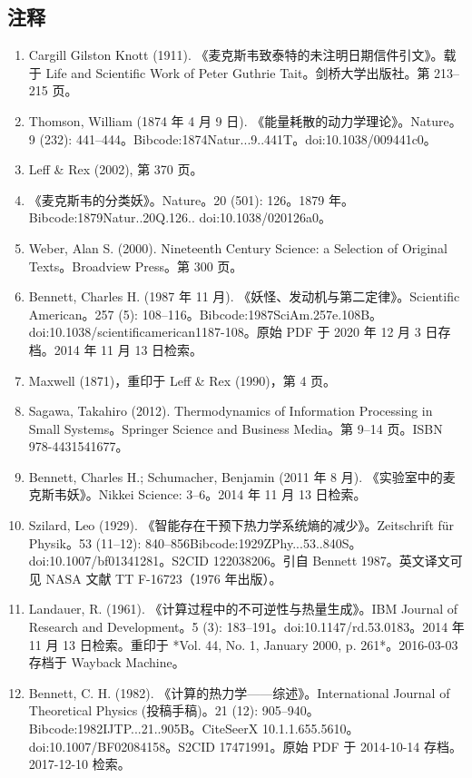 \subsection{注释}
\begin{enumerate}
\item Cargill Gilston Knott (1911). 《麦克斯韦致泰特的未注明日期信件引文》。载于 Life and Scientific Work of Peter Guthrie Tait。剑桥大学出版社。第 213–215 页。
\item Thomson, William (1874 年 4 月 9 日). 《能量耗散的动力学理论》。Nature。9 (232): 441–444。Bibcode:1874Natur...9..441T。doi:10.1038/009441c0。
\item Leff & Rex (2002), 第 370 页。
\item 《麦克斯韦的分类妖》。Nature。20 (501): 126。1879 年。Bibcode:1879Natur..20Q.126.. doi:10.1038/020126a0。
\item Weber, Alan S. (2000). Nineteenth Century Science: a Selection of Original Texts。Broadview Press。第 300 页。
\item Bennett, Charles H. (1987 年 11 月). 《妖怪、发动机与第二定律》。Scientific American。257 (5): 108–116。Bibcode:1987SciAm.257e.108B。doi:10.1038/scientificamerican1187-108。原始 PDF 于 2020 年 12 月 3 日存档。2014 年 11 月 13 日检索。
\item Maxwell (1871)，重印于 Leff & Rex (1990)，第 4 页。
\item Sagawa, Takahiro (2012). Thermodynamics of Information Processing in Small Systems。Springer Science and Business Media。第 9–14 页。ISBN 978-4431541677。
\item Bennett, Charles H.; Schumacher, Benjamin (2011 年 8 月). 《实验室中的麦克斯韦妖》。Nikkei Science: 3–6。2014 年 11 月 13 日检索。
\item Szilard, Leo (1929). 《智能存在干预下热力学系统熵的减少》。Zeitschrift für Physik。53 (11–12): 840–856Bibcode:1929ZPhy...53..840S。doi:10.1007/bf01341281。S2CID 122038206。引自 Bennett 1987。英文译文可见 NASA 文献 TT F-16723（1976 年出版）。
\item Landauer, R. (1961). 《计算过程中的不可逆性与热量生成》。IBM Journal of Research and Development。5 (3): 183–191。doi:10.1147/rd.53.0183。2014 年 11 月 13 日检索。重印于 *Vol. 44, No. 1, January 2000, p. 261*。2016-03-03 存档于 Wayback Machine。
\item Bennett, C. H. (1982). 《计算的热力学——综述》。International Journal of Theoretical Physics (投稿手稿)。21 (12): 905–940。Bibcode:1982IJTP...21..905B。CiteSeerX 10.1.1.655.5610。doi:10.1007/BF02084158。S2CID 17471991。原始 PDF 于 2014-10-14 存档。2017-12-10 检索。

\end{enumerate}
